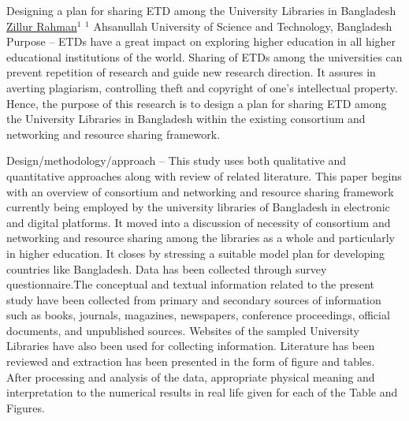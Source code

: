 

    \begin{abstract_online}{Designing a plan for sharing ETD among the University Libraries in Bangladesh}{%
    \underline{Zillur Rahman}$^{1}$}{%
    }{%
    $^1$ Ahsanullah University of Science and Technology, Bangladesh
}
  	 Purpose – ETDs have a great impact on exploring higher education in all higher educational institutions of the world. Sharing of ETDs among the universities can prevent repetition of research and guide new research direction.  It assures in averting plagiarism, controlling theft and copyright of one’s intellectual property. Hence, the purpose of this research is to design a plan for sharing ETD among the University Libraries in Bangladesh within the existing consortium and networking and resource sharing framework.
         
         Design/methodology/approach – This study uses both qualitative and quantitative approaches along with review of related literature. This paper begins with an overview of consortium and networking and resource sharing framework currently being employed by the university libraries of Bangladesh in electronic and digital platforms. It moved into a discussion of necessity of consortium and networking and resource sharing among the libraries as a whole and particularly in higher education. It closes by stressing a suitable model plan for developing countries like Bangladesh. Data has been collected through survey questionnaire.The conceptual and textual information related to the present study have been collected from primary and secondary sources of information such as books, journals, magazines, newspapers, conference proceedings, official documents, and unpublished sources. Websites of the sampled University Libraries have also been used for collecting information. Literature has been reviewed and extraction has been presented in the form of figure and tables. After processing and analysis of the data, appropriate physical meaning and interpretation to the numerical results in real life given for each of the Table and Figures.
      

\end{abstract_online}
